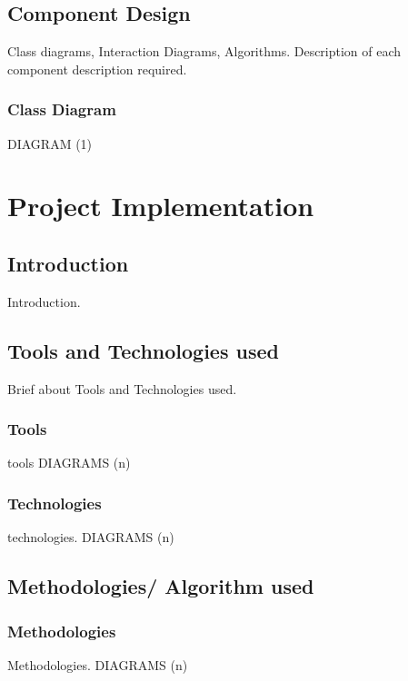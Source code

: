 \documentclass{report} %
\begin{document}
		\section{Component Design}
		Class diagrams, Interaction Diagrams, Algorithms. Description of each component
		description required.
			
			\subsection{Class Diagram}
			
			DIAGRAM (1)
			
	
	\chapter{Project Implementation}
	\pagebreak	
		\section{Introduction}
		Introduction.
		
		\section{Tools and Technologies used}
		Brief about Tools and Technologies used.
			
			\subsection{Tools}
			tools
			DIAGRAMS (n)
			
			\subsection{Technologies}
			technologies.
			DIAGRAMS (n)
		
		\section{Methodologies/ Algorithm used}
			
			\subsection{Methodologies}
			Methodologies.
			DIAGRAMS (n)
			
\end{document}
